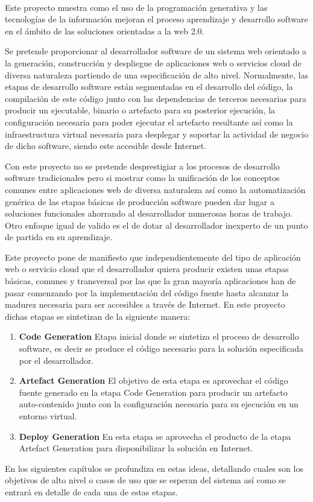 
\vspace{0.7cm}
\\


Este proyecto muestra como el uso de la programación generativa y las tecnologías de la información mejoran el proceso  aprendizaje y desarrollo software en el ámbito de las soluciones orientadas a la web 2.0. 

Se pretende proporcionar al desarrollador software de un sistema web orientado a la generación, construcción y despliegue de aplicaciones web o servicios cloud  de diversa naturaleza partiendo de una especificación de alto nivel.  Normalmente, las etapas de desarrollo software están segmentadas en el desarrollo del código, la compilación de este código junto con las dependencias de terceros necesarias para producir un ejecutable, binario o artefacto para su posterior ejecución,  la configuración necesaria para poder ejecutar el artefacto resultante así como  la infraestructura virtual necesaria para desplegar y soportar la actividad de negocio de  dicho software, siendo este accesible desde Internet. 

Con este proyecto no se pretende desprestigiar a los procesos de desarrollo software tradicionales pero si mostrar como la unificación de los conceptos comunes entre aplicaciones web de diversa naturaleza así como la automatización genérica de las etapas básicas de producción software pueden dar lugar a soluciones funcionales ahorrando al desarrollador numerosas horas de trabajo. Otro enfoque igual de valido es el de dotar al desarrollador inexperto de un punto de partida en su aprendizaje. 


Este proyecto pone de manifiesto que independientemente del tipo de aplicación web o servicio cloud que el desarrollador quiera producir existen unas etapas básicas, comunes  y transversal por las que la gran mayoría  aplicaciones han de pasar comenzando por la implementación del código fuente hasta alcanzar la madurez necesaria para ser accesibles a través de Internet.  En este proyecto dichas etapas se sintetizan de la siguiente manera: 

\begin{enumerate}
\item \textbf{ Code Generation }  Etapa inicial donde se sintetiza el proceso de desarrollo software, es decir se produce el código necesario para la solución especificada por el desarrollador. 
\item \textbf{ Artefact Generation }  El objetivo de esta etapa es aprovechar el código fuente generado en la etapa Code Generation para producir un artefacto auto-contenido junto con la configuración necesaria para su ejecución en un entorno virtual. 
\item \textbf{ Deploy Generation } En esta etapa se aprovecha el producto de la etapa Artefact Generation para disponibilizar la solución en Internet. 
\end{enumerate}


En los siguientes capítulos se profundiza en estas ideas, detallando cuales son los objetivos de alto nivel o casos de uso que se esperan del sistema así como se entrará en detalle de cada una de estas etapas.  


